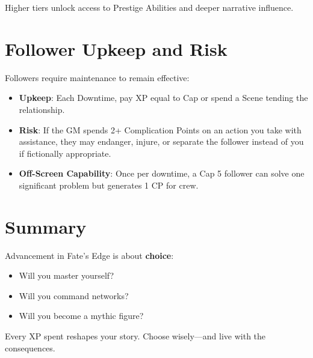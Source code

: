 Higher tiers unlock access to Prestige Abilities and deeper narrative influence.

\section{Follower Upkeep and Risk}

Followers require maintenance to remain effective:

\begin{itemize}
  \item \textbf{Upkeep}: Each Downtime, pay XP equal to Cap or spend a Scene tending the relationship.
  \item \textbf{Risk}: If the GM spends 2+ Complication Points on an action you take with assistance, they may endanger, injure, or separate the follower instead of you if fictionally appropriate.
  \item \textbf{Off-Screen Capability}: Once per downtime, a Cap 5 follower can solve one significant problem but generates 1 CP for crew.
\end{itemize}

\section{Summary}

Advancement in Fate's Edge is about \textbf{choice}:

\begin{itemize}
  \item Will you master yourself?
  \item Will you command networks?
  \item Will you become a mythic figure?
\end{itemize}

Every XP spent reshapes your story. Choose wisely—and live with the consequences.
